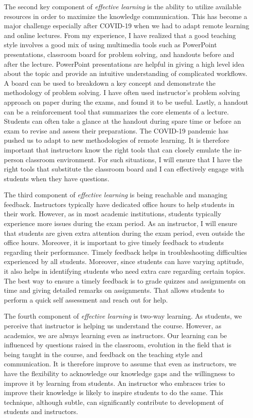 \documentclass{NSF}
\begin{document}
The second key component of {\em effective learning} is the ability to utilize available resources in order to maximize the knowledge communication. This has become a major challenge especially after COVID-19 when we had to adapt remote learning and online lectures. From my experience, I have realized that a good teaching style involves a good mix of using multimedia tools such as PowerPoint presentations, classroom board for problem solving, and handouts before and after the lecture. PowerPoint presentations are helpful in giving a high level idea about the topic and provide an intuitive understanding of complicated workflows. A board can be used to breakdown a key concept and demonstrate the methodology of problem solving. I have often used instructor's problem solving approach on paper during the exams, and found it to be useful. Lastly, a handout can be a reinforcement tool that summarizes the core elements of a lecture. Students can often take a glance at the handout during spare time or before an exam to revise and assess their preparations. The COVID-19 pandemic has pushed us to adapt to new methodologies of remote learning. It is therefore important that instructors know the right tools that can closely emulate the in-person classroom environment. For such situations, I will ensure that I have the right tools that substitute the classroom board and I can effectively engage with students when they have questions. 


The third component of {\em effective learning} is being reachable and managing feedback. Instructors typically have dedicated office hours to help students in their work. However, as in most academic institutions, students typically experience more issues during the exam period. As an instructor, I will ensure that students are given extra attention during the exam period, even outside the office hours. Moreover, it is important to give timely feedback to students regarding their performance. Timely feedback helps in troubleshooting difficulties experienced by all students. Moreover, since students can have varying aptitude, it also helps in identifying students who need extra care regarding certain topics. The best way to ensure a timely feedback is to grade quizzes and assignments on time and giving detailed remarks on assignments. That allows students to perform a quick self assessment and reach out for help. 


The fourth component of {\em effective learning} is two-way learning. As students, we perceive that instructor is helping us understand the course. However, as academics, we are always learning even as instructors. Our learning can be influenced by questions raised in the classroom, evolution in the field that is being taught in the course, and feedback on the teaching style and communication. It is therefore improve to assume that even as instructors, we have the flexibility to acknowledge our knowledge gaps and the willingness to improve it by learning from students. An instructor who embraces tries to improve their knowledge is likely to inspire students to do the same. This technique, although subtle, can significantly contribute to development of students and instructors. 
\end{document}
